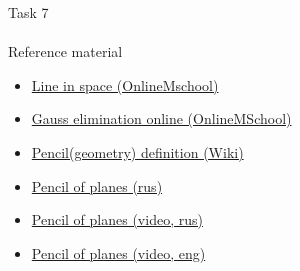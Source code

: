 \documentclass[aspectratio=169]{beamer}
\newcommand{\fbckg}[1]{\usebackgroundtemplate{\texttt{[image: \#1]}}}%
\begin{document}
\begin{frame}[t]{Task 7}
    \framesubtitle{}
\end{frame}

\begin{frame}[t]{Reference material}
    \Large
    \begin{itemize}
        \item \href{https://onlinemschool.com/math/library/analytic_geometry/line/}{Line in space (OnlineMschool)}
        \item \href{https://onlinemschool.com/math/assistance/equation/gaus/}{Gauss elimination online (OnlineMSchool)}
        \item \href{https://en.wikipedia.org/wiki/Pencil_(geometry)}{Pencil(geometry) definition (Wiki)}
        \item \href{http://www.cleverstudents.ru/line_and_plane/pencil_of_planes.html}{Pencil of planes (rus)}
        \item \href{https://youtu.be/8uDOczIFVbU}{Pencil of planes (video, rus)}
        \item \href{https://www.youtube.com/watch?v=RujKAqwIz2Q}{Pencil of planes (video, eng)}
    \end{itemize}
\end{frame}

\fbckg{fibeamer/figs/last_page.png}
\frame[plain]{}
\end{document}
